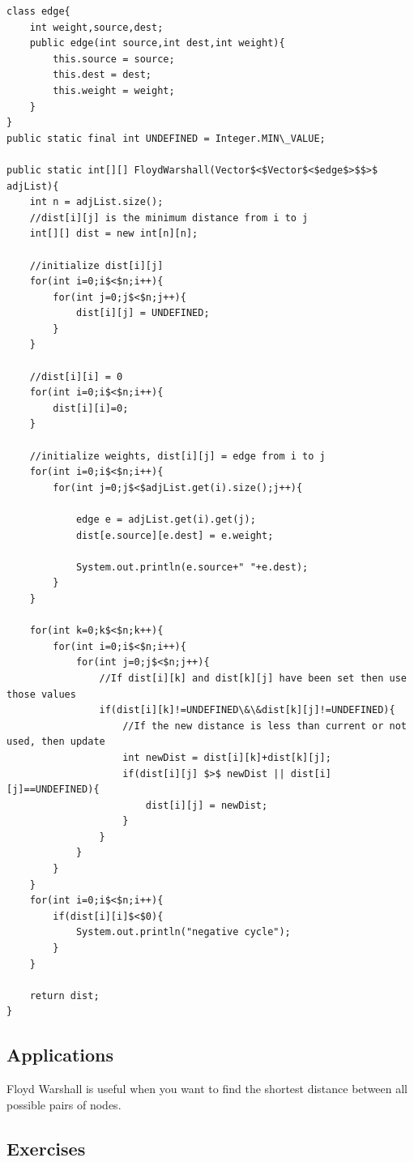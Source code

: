 \documentclass[11pt,oneside]{book}
\begin{document}
\begin{lstlisting}
class edge{
    int weight,source,dest;
    public edge(int source,int dest,int weight){
        this.source = source;
        this.dest = dest;
        this.weight = weight;
    }
}
public static final int UNDEFINED = Integer.MIN\_VALUE;
    
public static int[][] FloydWarshall(Vector$<$Vector$<$edge$>$$>$ adjList){
    int n = adjList.size();
    //dist[i][j] is the minimum distance from i to j
    int[][] dist = new int[n][n];
    
    //initialize dist[i][j]
    for(int i=0;i$<$n;i++){
        for(int j=0;j$<$n;j++){
            dist[i][j] = UNDEFINED;
        }
    }
    
    //dist[i][i] = 0
    for(int i=0;i$<$n;i++){
        dist[i][i]=0;
    }
    
    //initialize weights, dist[i][j] = edge from i to j
    for(int i=0;i$<$n;i++){
        for(int j=0;j$<$adjList.get(i).size();j++){
            
            edge e = adjList.get(i).get(j);
            dist[e.source][e.dest] = e.weight;
            
            System.out.println(e.source+" "+e.dest);
        }
    }
    
    for(int k=0;k$<$n;k++){
        for(int i=0;i$<$n;i++){
            for(int j=0;j$<$n;j++){
                //If dist[i][k] and dist[k][j] have been set then use those values
                if(dist[i][k]!=UNDEFINED\&\&dist[k][j]!=UNDEFINED){
                    //If the new distance is less than current or not used, then update
                    int newDist = dist[i][k]+dist[k][j];
                    if(dist[i][j] $>$ newDist || dist[i][j]==UNDEFINED){
                        dist[i][j] = newDist;
                    }
                }
            }
        }
    }
    for(int i=0;i$<$n;i++){
        if(dist[i][i]$<$0){
            System.out.println("negative cycle");
        }
    }
    
    return dist;
}
\end{lstlisting}

\subsection{Applications}

Floyd Warshall is useful when you want to find the shortest distance between all possible pairs of nodes.

\subsection{Exercises}
\end{document}
